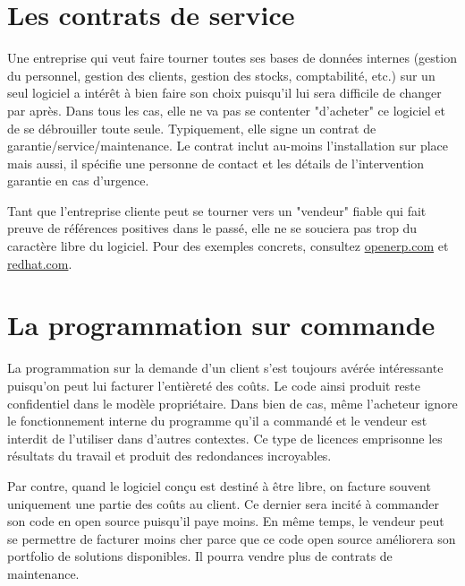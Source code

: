 \section*{Les contrats de service}
Une entreprise qui veut faire tourner toutes ses bases de données internes (gestion du personnel,
gestion des clients, gestion des stocks, comptabilité, etc.) sur un seul logiciel a intérêt à bien faire son choix puisqu'il lui sera difficile de changer par après.%
Dans tous les cas, elle ne va pas se contenter "d'acheter" ce logiciel et de se débrouiller toute seule.
Typiquement, elle signe un contrat de garantie/service/maintenance. %
Le contrat inclut au-moins l'installation sur place mais aussi, il spécifie une personne de contact et les détails de l'intervention garantie en cas d'urgence.

Tant que l'entreprise cliente peut se tourner vers un "vendeur" fiable qui fait preuve de références 
positives dans le passé, elle ne se souciera pas trop du caractère libre du logiciel. %
Pour des exemples concrets, consultez \url{openerp.com} et \url{redhat.com}.

\section*{La programmation sur commande}
La programmation sur la demande d'un client %
s'est toujours avérée intéressante puisqu'on
peut lui facturer l'entièreté des coûts. Le code ainsi produit reste confidentiel dans le
modèle propriétaire. Dans bien de cas, même l'acheteur ignore le fonctionnement 
interne du programme qu'il a commandé et le vendeur est interdit de l'utiliser dans d'autres contextes.
Ce type de licences emprisonne les résultats du travail et produit des redondances incroyables.

Par contre, quand le logiciel conçu est destiné à être libre, on facture souvent uniquement une partie 
des coûts au client. Ce dernier sera incité à commander son code en open source puisqu'il paye moins. %
En même temps, le vendeur peut se permettre de facturer moins cher parce que ce code open source
améliorera son portfolio de solutions disponibles. Il pourra vendre plus de contrats de maintenance.

